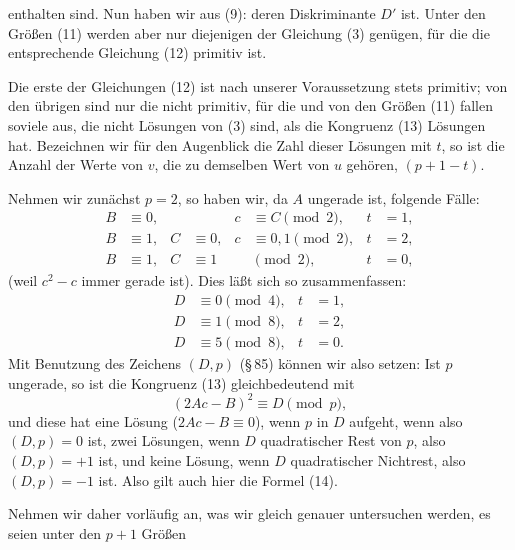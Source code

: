 enthalten sind. Nun haben wir aus (9):
deren Diskriminante $D'$ ist. Unter den Größen (11) werden aber nur diejenigen der Gleichung (3) genügen, für die die entsprechende Gleichung (12) primitiv ist.

Die erste der Gleichungen (12) ist nach unserer Voraussetzung stets primitiv; von den übrigen sind nur die nicht primitiv, für die
und von den Größen (11) fallen soviele aus, die nicht Lösungen von (3) sind, als die Kongruenz (13) Lösungen hat. Bezeichnen wir für den Augenblick die Zahl dieser Lösungen mit $t$, so ist die Anzahl der Werte von $v$, die zu demselben Wert von $u$ gehören, $(p + 1 - t)$.

Nehmen wir zunächst $p = 2$, so haben wir, da $A$ ungerade ist, folgende Fälle:
\[
\begin{aligned}
B &\equiv 0, & & & c &\equiv C \pmod{2}, & t &= 1, \\
B &\equiv 1, & C &\equiv 0, & c &\equiv 0, 1 \pmod{2}, & t &= 2, \\
B &\equiv 1, & C &\equiv 1 & & \pmod{2}, & t &= 0,
\end{aligned}
\]
(weil $c^2 - c$ immer gerade ist). Dies läßt sich so zusammenfassen:
\[
\begin{aligned}
D &\equiv 0 \pmod{4}, & t &= 1, \\
D &\equiv 1 \pmod{8}, & t &= 2, \\
D &\equiv 5 \pmod{8}, & t &= 0.
\end{aligned}
\]
Mit Benutzung des Zeichens $(D, p)$ (\S\,85) können wir also setzen:
Ist $p$ ungerade, so ist die Kongruenz (13) gleichbedeutend mit
\[
(2Ac - B)^2 \equiv D \pmod{p},
\]
und diese hat eine Lösung ($2Ac - B \equiv 0$), wenn $p$ in $D$ aufgeht, wenn also $(D, p) = 0$ ist, zwei Lösungen, wenn $D$ quadratischer Rest von $p$, also $(D, p) = +1$ ist, und keine Lösung, wenn $D$ quadratischer Nichtrest, also $(D, p) = -1$ ist. Also gilt auch hier die Formel (14).

Nehmen wir daher vorläufig an, was wir gleich genauer untersuchen werden, es seien unter den $p + 1$ Größen
